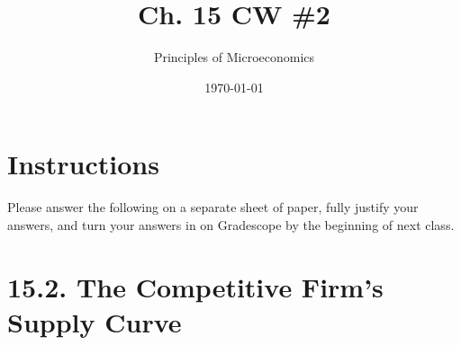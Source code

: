 \documentclass{article}
\title{Ch. 15 CW \#2}
\author{Principles of Microeconomics}
\date{\today}
\begin{document}
\maketitle

\section*{Instructions}

Please answer the following on a separate sheet of paper, fully justify your answers, and turn your answers in on Gradescope by the beginning of next class. 

\section*{15.2. The Competitive Firm's Supply Curve}
\end{document}
